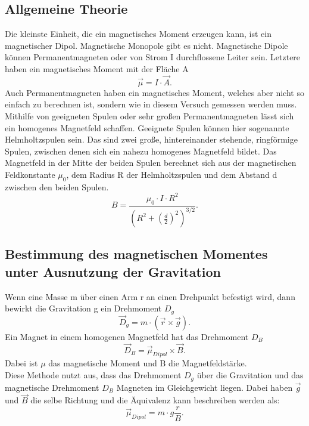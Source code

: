 \subsection{Allgemeine Theorie}
Die kleinste Einheit, die ein magnetisches Moment erzeugen kann, ist ein magnetischer Dipol.
Magnetische Monopole gibt es nicht.
Magnetische Dipole können Permanentmagneten oder von Strom I durchflossene Leiter sein.
Letztere haben ein magnetisches Moment mit der Fläche A
\begin{equation*}
    \vec{\mu}= I \cdot \vec{A}.
\end{equation*}
Auch Permanentmagneten haben ein magnetisches Moment, welches aber nicht so einfach zu berechnen ist, sondern wie in diesem Versuch gemessen werden muss.
Mithilfe von geeigneten Spulen oder sehr großen Permanentmagneten lässt sich ein homogenes Magnetfeld schaffen.
Geeignete Spulen können hier sogenannte Helmholtzspulen sein.
Das sind zwei große, hintereinander stehende, ringförmige Spulen, zwischen denen sich ein nahezu homogenes Magnetfeld bildet.
Das Magnetfeld in der Mitte der beiden Spulen berechnet sich aus der magnetischen Feldkonstante \emph{$\mu_0$}, dem Radius R der Helmholtzspulen und dem Abstand d zwischen den beiden Spulen.
  \begin{equation}
    B=\frac{\mu_0 \cdot I \cdot R^2}{(R^2 + (\frac{d}{2})^2)^{3/2}}.
  \label{eqn:bfeld}
  \end{equation}

\subsection{Bestimmung des magnetischen Momentes unter Ausnutzung der Gravitation}
Wenn eine Masse m über einen Arm r an einen Drehpunkt befestigt wird, dann bewirkt die Gravitation g ein Drehmoment $D_{g}$
\begin{equation*}
  \vec{D}_{g}=m \cdot (\vec{r} \times \vec{g}).
\end{equation*}
Ein Magnet in einem homogenen Magnetfeld hat das Drehmoment $D_{B}$
\begin{equation*}
  \vec{D}_{B}=\vec{\mu}_{Dipol} \times \vec{B}.
\end{equation*}
Dabei ist $\mu$ das magnetische Moment und B die Magnetfeldstärke.
\\Diese Methode nutzt aus, dass das Drehmoment $D_{g}$ über die Gravitation und das magnetische Drehmoment $D_{B}$ Magneten im Gleichgewicht liegen.
Dabei haben $\vec{g}$ und $\vec{B}$ die selbe Richtung und die Äquivalenz kann beschreiben werden als:
  \begin{equation}
    \vec{\mu}_{Dipol}= m \cdot g \frac{r}{B}.
  \label{eqn:bmom1}
  \end{equation}

